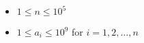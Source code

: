 \begin{itemize}
\tightlist
\item $1 \leq n \leq 10^5$
\item $1 \leq a_i \leq 10^9$ for $i = 1, 2, \ldots, n$
\end{itemize}
